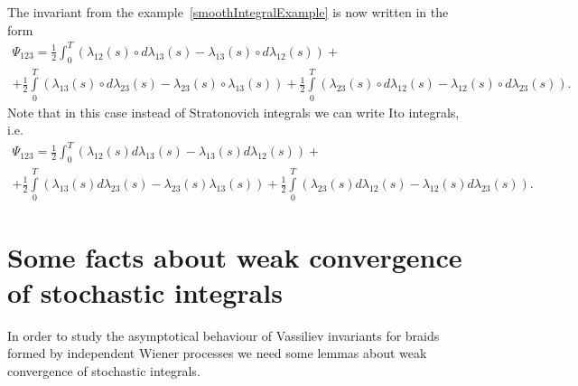\documentclass[12pt, a4paper, titlepage]{article}
\begin{document}
\begin{example}
 The invariant from the example~\ref{smoothIntegralExample} is now written in the form
\begin{multline}\label{stratonovichSpecificInvariantFormula}
 \Psi_{123}=\frac12 \int_0^T(\lambda_{12}(s) \circ d\lambda_{13}(s)-\lambda_{13}(s) \circ d\lambda_{12}(s))+\\+
\frac12 \int\limits_0^T(\lambda_{13}(s)\circ d\lambda_{23}(s)-\lambda_{23}(s)\circ \lambda_{13}(s))+
\frac12 \int\limits_0^T(\lambda_{23}(s)\circ d\lambda_{12}(s)-\lambda_{12}(s)\circ d\lambda_{23}(s)).
\end{multline}
Note that in this case instead of Stratonovich integrals 
we can write Ito integrals, i.e. 
\begin{multline}\label{simleItoEquivalentRepresentation}
 \Psi_{123}=\frac12 \int_0^T(\lambda_{12}(s) d\lambda_{13}(s)-\lambda_{13}(s) d\lambda_{12}(s))+\\+
\frac12 \int\limits_0^T(\lambda_{13}(s) d\lambda_{23}(s)-\lambda_{23}(s) \lambda_{13}(s))+
\frac12 \int\limits_0^T(\lambda_{23}(s) d\lambda_{12}(s)-\lambda_{12}(s) d\lambda_{23}(s)).
\end{multline}
\end{example}

\section{Some facts about weak convergence of stochastic integrals}\label{weakConvergence}
In order to study the asymptotical behaviour of Vassiliev invariants
for braids formed by independent Wiener processes
we need some lemmas about weak convergence of stochastic integrals. 
\end{document}

